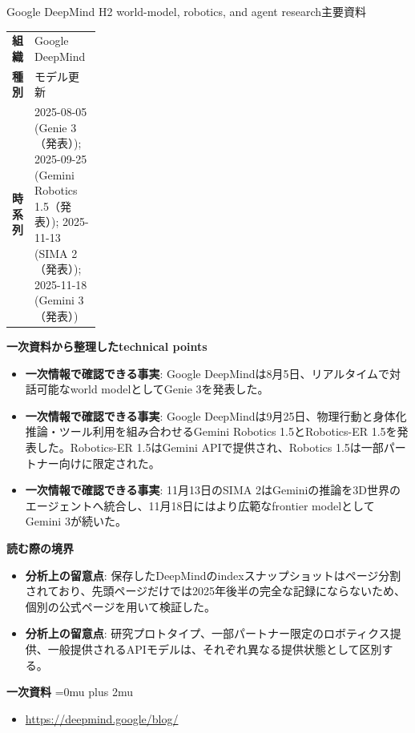 \begin{technicalnote}{Google DeepMind H2 world-model, robotics, and agent research}{主要資料}
\begingroup
\begin{tabularx}{\linewidth}{@{}>{\bfseries}p{0.22\linewidth}X@{}}
組織 & Google DeepMind \\
種別 & モデル更新 \\
時系列 & 2025-08-05 (Genie 3（発表）); 2025-09-25 (Gemini Robotics 1.5（発表）); 2025-11-13 (SIMA 2（発表）); 2025-11-18 (Gemini 3（発表）) \\
\end{tabularx}
\smallskip
{\bfseries 一次資料から整理したtechnical points}
\begin{itemize}[leftmargin=1.5em,itemsep=0.35em]
\item \textbf{一次情報で確認できる事実}: Google DeepMindは8月5日、リアルタイムで対話可能なworld modelとしてGenie 3を発表した。
\item \textbf{一次情報で確認できる事実}: Google DeepMindは9月25日、物理行動と身体化推論・ツール利用を組み合わせるGemini Robotics 1.5とRobotics-ER 1.5を発表した。Robotics-ER 1.5はGemini APIで提供され、Robotics 1.5は一部パートナー向けに限定された。
\item \textbf{一次情報で確認できる事実}: 11月13日のSIMA 2はGeminiの推論を3D世界のエージェントへ統合し、11月18日にはより広範なfrontier modelとしてGemini 3が続いた。
\end{itemize}
\begin{minipage}{\linewidth}
{\bfseries 読む際の境界}
\begin{itemize}[leftmargin=1.5em,itemsep=0.35em]
\item \textbf{分析上の留意点}: 保存したDeepMindのindexスナップショットはページ分割されており、先頭ページだけでは2025年後半の完全な記録にならないため、個別の公式ページを用いて検証した。
\item \textbf{分析上の留意点}: 研究プロトタイプ、一部パートナー限定のロボティクス提供、一般提供されるAPIモデルは、それぞれ異なる提供状態として区別する。
\end{itemize}
\begin{samepage}
{\bfseries 一次資料}
\begingroup\sloppy
\Urlmuskip=0mu plus 2mu\relax
\begin{itemize}[leftmargin=1.5em,itemsep=0.25em]
\item {\scriptsize\url{https://deepmind.google/blog/}}
\end{itemize}
\endgroup
\end{samepage}
\end{minipage}
\endgroup
\end{technicalnote}
\medskip

